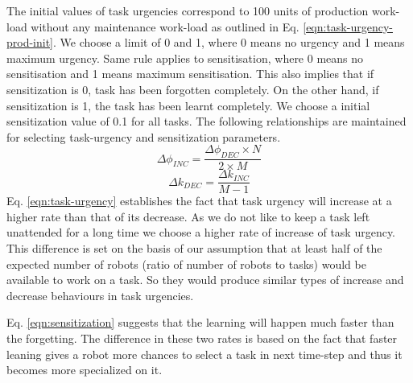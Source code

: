 \documentclass[journal]{IEEEtran}
\begin{document}
The initial values of task urgencies correspond to 100 units of production work-load without any maintenance work-load as outlined in Eq. \ref{eqn:task-urgency-prod-init}. We choose a limit of 0 and 1, where 0 means no urgency and 1 means maximum urgency. Same rule applies to sensitisation, where 0 means no sensitisation and 1 means maximum sensitisation. This also implies that if sensitization is 0, task has been forgotten completely. On the other hand, if sensitization is 1, the task has been learnt completely. We choose a initial sensitization value of 0.1 for all tasks. The following relationships are maintained for selecting task-urgency and sensitization parameters.
\begin{equation}
\Delta\phi_{INC} = \frac{\Delta\phi_{DEC} \times N}{2 \times M}
\label{eqn:task-urgency}
\end{equation}
%
\begin{equation}
\Delta k_{DEC} = \frac{\Delta k_{INC}} {M - 1} 
\label{eqn:sensitization}
\end{equation}
%
Eq. \ref{eqn:task-urgency} establishes the fact that task urgency will increase at a higher rate than that of its decrease. As we do not like to keep a task left unattended for a long time we choose a higher rate of increase of task urgency. This difference is set on the basis of our assumption that at least half of the expected number of robots (ratio of number of robots to tasks) would be available to work on a task. So they would produce similar types of increase and decrease behaviours in task urgencies.

Eq. \ref{eqn:sensitization} suggests that the learning will happen much faster than the forgetting. The difference in these two rates is based on the fact that faster leaning gives a robot more chances to select a task in next time-step and thus it becomes more specialized on it.
\end{document}
